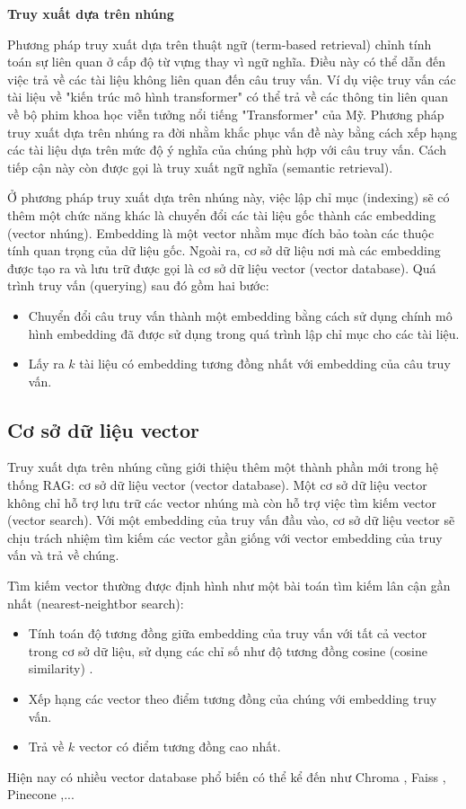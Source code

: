 \vspace{1em}
\textbf{Truy xuất dựa trên nhúng} 

Phương pháp truy xuất dựa trên thuật ngữ (term-based retrieval) chỉnh tính toán sự liên quan ở cấp độ từ vựng thay vì ngữ nghĩa. Điều này có thể dẫn đến việc trả về các tài liệu không liên quan đến câu truy vấn. Ví dụ việc truy vấn các tài liệu về "kiến trúc mô hình transformer" có thể trả về các thông tin liên quan về bộ phim khoa học viễn tưởng nổi tiếng "Transformer" của Mỹ. Phương pháp truy xuất dựa trên nhúng ra đời nhằm khắc phục vấn đề này bằng cách xếp hạng các tài liệu dựa trên mức độ ý nghĩa của chúng phù hợp với câu truy vấn. Cách tiếp cận này còn được gọi là truy xuất ngữ nghĩa (semantic retrieval).

Ở phương pháp truy xuất dựa trên nhúng này, việc lập chỉ mục (indexing) sẽ có thêm một chức năng khác là chuyển đổi các tài liệu gốc thành các embedding (vector nhúng). Embedding là một vector nhằm mục đích bảo toàn các thuộc tính quan trọng của dữ liệu gốc. Ngoài ra, cơ sở dữ liệu nơi mà các embedding được tạo ra và lưu trữ được gọi là cơ sở dữ liệu vector (vector database). Quá trình truy vấn (querying) sau đó gồm hai bước:
\begin{itemize}
    \item Chuyển đổi câu truy vấn thành một embedding bằng cách sử dụng chính mô hình embedding đã được sử dụng trong quá trình lập chỉ mục cho các tài liệu.
    \item Lấy ra $k$ tài liệu có embedding tương đồng nhất với embedding của câu truy vấn.
\end{itemize}

\vspace{1em}
\subsection{Cơ sở dữ liệu vector}
Truy xuất dựa trên nhúng cũng giới thiệu thêm một thành phần mới trong hệ thống RAG: cơ sở dữ liệu vector (vector database). Một cơ sở dữ liệu vector không chỉ hỗ trợ lưu trữ các vector nhúng mà còn hỗ trợ việc tìm kiếm vector (vector search). Với một embedding của truy vấn đầu vào, cơ sở dữ liệu vector sẽ chịu trách nhiệm tìm kiếm các vector gần giống với vector embedding của truy vấn và trả về chúng.

Tìm kiếm vector thường được định hình như một bài toán tìm kiếm lân cận gần nhất (nearest-neightbor search):
\begin{itemize}
    \item Tính toán độ tương đồng giữa embedding của truy vấn với tất cả vector trong cơ sở dữ liệu, sử dụng các chỉ số như độ tương đồng cosine (cosine similarity) \cite{ref_article42}.
    \item Xếp hạng các vector theo điểm tương đồng của chúng với embedding truy vấn.
    \item Trả về $k$ vector có điểm tương đồng cao nhất.
\end{itemize}
Hiện nay có nhiều vector database phổ biến có thể kể đến như Chroma \cite{ref_article17}, Faiss \cite{ref_article43}, Pinecone \cite{ref_article44},...

